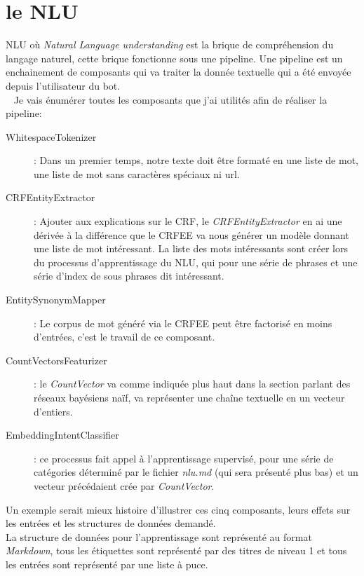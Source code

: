 \section{le NLU}
NLU où \textit{Natural Language understanding} est la brique de compréhension du langage naturel, cette brique fonctionne sous une pipeline. Une pipeline est un enchainement de composants qui va traiter la donnée textuelle qui a été envoyée depuis l'utilisateur du bot.\\
\ \linebreak
Je vais énumérer toutes les composants que j'ai utilités afin de réaliser la pipeline:
\begin{description}
\item[WhitespaceTokenizer]: Dans un premier temps, notre texte doit être formaté en une liste de mot, une liste de mot sans caractères spéciaux ni url.
\item[CRFEntityExtractor]: Ajouter aux explications sur le CRF, le \textit{CRFEntityExtractor} en ai une dérivée à la différence que le CRFEE va nous générer un modèle donnant une liste de mot intéressant. La liste des mots intéressants sont créer lors du processus d'apprentissage du NLU, qui pour une série de phrases et une série d'index de sous phrases dit intéressant.
\item[EntitySynonymMapper]: Le corpus de mot généré via le CRFEE peut être factorisé en moins d'entrées, c'est le travail de ce composant.
\item[CountVectorsFeaturizer]: le \textit{CountVector} va comme indiquée plus haut dans la section parlant des réseaux bayésiens naïf, va représenter une chaîne textuelle en un vecteur d'entiers.
\item[EmbeddingIntentClassifier]: ce processus fait appel à l'apprentissage supervisé, pour une série de catégories déterminé par le fichier \textit{nlu.md} (qui sera présenté plus bas) et un vecteur précédaient crée par \textit{CountVector}.
\end{description}

\pagebreak

Un exemple serait mieux histoire d'illustrer ces cinq composants, leurs effets sur les entrées et les structures de données demandé.\\
La structure de données pour l'apprentissage sont représenté au format \textit{Markdown}, tous les étiquettes sont représenté par des titres de niveau 1 et tous les entrées sont représenté par une liste à puce.\\

